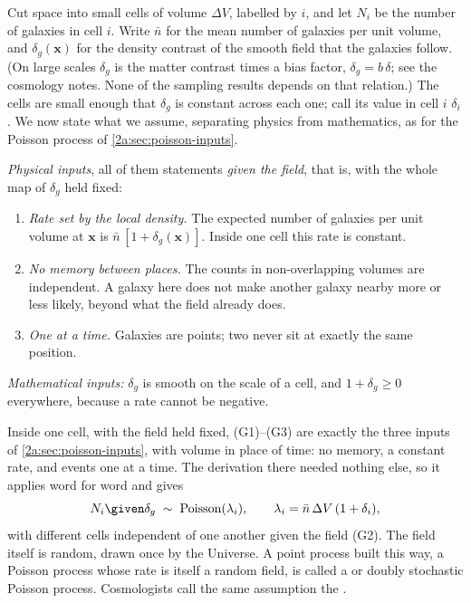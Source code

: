 Cut space into small cells of volume $\Delta V$, labelled by $i$, and let $N_i$ be
the number of galaxies in cell $i$. Write $\bar n$ for the mean number of galaxies
per unit volume, and $\delta_g(\bm x)$ for the density contrast of the smooth
field that the galaxies follow. (On large scales $\delta_g$ is the matter contrast
times a bias factor, $\delta_g=b\,\delta$; see the cosmology notes. None of the sampling results depends on that relation.) The cells are small enough that $\delta_g$ is
constant across each one; call its value in cell $i$ $\delta_i$. We now state
what we assume, separating physics from mathematics, as for the Poisson process of
\cref{2a:sec:poisson-inputs}.

\emph{Physical inputs}, all of them statements \emph{given the field}, that is,
with the whole map of $\delta_g$ held fixed:
\begin{enumerate}[label=(G\arabic*),leftmargin=2.6em,itemsep=1pt]
  \item \emph{Rate set by the local density.} The expected number of galaxies per
        unit volume at $\bm x$ is $\bar n\,[1+\delta_g(\bm x)]$. Inside one cell
        this rate is constant.
  \item \emph{No memory between places.} The counts in non-overlapping volumes are
        independent. A galaxy here does not make another galaxy nearby more or less
        likely, beyond what the field already does.
  \item \emph{One at a time.} Galaxies are points; two never sit at exactly the
        same position.
\end{enumerate}
\emph{Mathematical inputs:} $\delta_g$ is smooth on the scale of a cell, and
$1+\delta_g\ge0$ everywhere, because a rate cannot be negative.

Inside one cell, with the field held fixed, (G1)--(G3) are exactly the three
inputs of \cref{2a:sec:poisson-inputs}, with volume in place of time: no memory,
a constant rate, and events one at a time. The derivation there needed nothing
else, so it applies word for word and gives
\begin{equation}
  N_i\given\delta_g\;\sim\;\mathrm{Poisson}(\lambda_i),\qquad
  \lambda_i=\bar n\,\Delta V\,(1+\delta_i),
  \label{11a:eq:cox-cell}
\end{equation}
with different cells independent of one another given the field (G2). The field
itself is random, drawn once by the Universe. A point process built this way, a
Poisson process whose rate is itself a random field, is called a  or doubly stochastic Poisson process. Cosmologists call the same
assumption the  .

